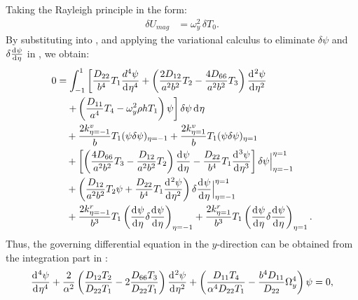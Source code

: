 \documentclass[preprint,12pt]{elsarticle}
\newcommand{\id}{\mathrm{d}\mkern1mu}
\begin{document}
Taking the Rayleigh principle in the form:
%
\begin{equation}\label{eq:Rayleighy}
	\begin{split}
		\delta U_{mag} &= \omega_y^2 \, \delta T_0.
	\end{split}
\end{equation}
%
By substituting  into , and applying the variational calculus to eliminate \( \delta \psi \) and \( \delta\frac{\id \psi}{\id \eta} \) in , we obtain:
%
\begin{equation}\label{eq:Rayleighy2}
	\begin{split}
		0 &= \int_{-1}^{1} \left[ \frac{D_{22}}{b^4} T_1 \frac{d^4 \psi}{\id \eta^4} 
		+ \left( \frac{2D_{12}}{a^2b^2} T_2 - \frac{4D_{66}}{a^2b^2} T_3 \right) \frac{\id^2 \psi}{\id \eta^2} \right. \\
		&\quad \left. + \left( \frac{D_{11}}{a^4} T_4 - \omega_y^2 \rho h T_1 \right) \psi \right] \delta \psi \, \id\eta \\
		&\quad + \frac{2k^v_{\eta=-1}}{b} T_1 (\psi \delta \psi)_{\eta=-1} 
		+ \frac{2k^v_{\eta=1}}{b} T_1 (\psi \delta \psi)_{\eta=1} \\
		&\quad + \left[ \left( \frac{4D_{66}}{a^2b^2} T_3 - \frac{D_{12}}{a^2b^2} T_2 \right) \frac{\id \psi}{\id \eta} 
		- \frac{D_{22}}{b^4} T_1 \frac{\id^3 \psi}{\id \eta^3} \right] \delta \psi \Big|^{\eta=1}_{\eta=-1} \\
		&\quad + \left( \frac{D_{12}}{a^2b^2} T_2 \psi + \frac{D_{22}}{b^4} T_1 \frac{\id^2 \psi}{\id \eta^2} \right) 
		\delta\frac{\id  \psi}{\id \eta} \Big|^{\eta=1}_{\eta=-1} \\
		&\quad + \frac{2k^r_{\eta=-1}}{b^3} T_1 \left( \frac{\id \psi}{\id \eta} \delta\frac{\id \psi}{\id \eta} \right)_{\eta=-1} 
		+ \frac{2k^r_{\eta=1}}{b^3} T_1 \left( \frac{\id \psi}{\id \eta} \delta\frac{\id \psi}{\id \eta} \right)_{\eta=1}.
	\end{split}
\end{equation}
%
Thus, the governing differential equation in the \( y \)-direction can be obtained from the integration part in :
%
\begin{equation}\label{eq:ODEy}
		\frac{\id^4 \psi}{\id \eta^4} + \frac{2}{\alpha^2}\left(\frac{D_{12}T_2}{D_{22}T_1} - 2\frac{D_{66}T_3}{D_{22}T_1}\right)\frac{\id^2 \psi}{\id \eta^2} + \left( \frac{D_{11}T_4}{\alpha^4D_{22}T_1} - \frac{b^4D_{11}}{D_{22}} \Omega_y^4 \right) \psi = 0,
\end{equation}
\end{document}

